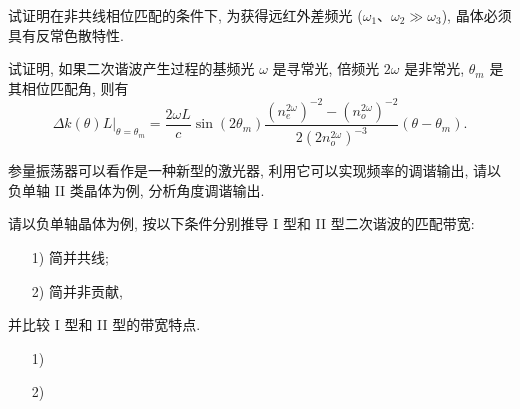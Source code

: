 \documentclass{assignment}
\begin{document}
\begin{prob}
    试证明在非共线相位匹配的条件下, 为获得远红外差频光 ($\omega_1$、$\omega_2\gg\omega_3$), 晶体必须具有反常色散特性.
\end{prob}
\begin{pf}
    
\end{pf}

\begin{prob}
    试证明, 如果二次谐波产生过程的基频光 $\omega$ 是寻常光, 倍频光 $2\omega$ 是非常光, $\theta_m$ 是其相位匹配角, 则有
    \[
        \Delta k(\theta)L|_{\theta=\theta_m}=\frac{2\omega L}{c}\sin(2\theta_m)\frac{(n_e^{2\omega})^{-2}-(n_o^{2\omega})^{-2}}{2(2n_o^{2\omega})^{-3}}(\theta-\theta_m).
    \]
\end{prob}
\begin{pf}
    
\end{pf}

\begin{prob}
    参量振荡器可以看作是一种新型的激光器, 利用它可以实现频率的调谐输出, 请以负单轴 II 类晶体为例, 分析角度调谐输出.
\end{prob}
\begin{sol}
    
\end{sol}

\begin{prob}
    请以负单轴晶体为例, 按以下条件分别推导 I 型和 II 型二次谐波的匹配带宽:
    \begin{itemize}
        \item[1)] 简并共线;
        \item[2)] 简并非贡献,
    \end{itemize}
    并比较 I 型和 II 型的带宽特点.
\end{prob}
\begin{pf}
    \begin{itemize}
        \item[1)] 
        \item[2)] 
    \end{itemize}
\end{pf}
\end{document}
